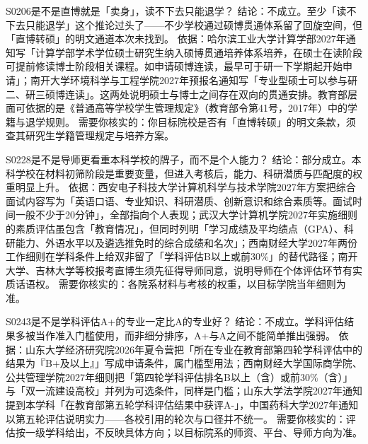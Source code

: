 \begin{qa}{S0206}{是不是直博就是「卖身」，读不下去只能退学？}
结论：不成立。至少「读不下去只能退学」这个推论过头了——不少学校通过硕博贯通体系留了回旋空间，但「直博转硕」的明文通道本次未找到。
依据：哈尔滨工业大学计算学部2027年通知写「计算学部学术学位硕士研究生纳入硕博贯通培养体系培养，在硕士在读阶段可提前修读博士阶段相关课程。如申请硕博连读，最早可于研一下学期起开始申请」；南开大学环境科学与工程学院2027年预报名通知写「专业型硕士可以参与研二、研三硕博连读」。这两处说明硕士与博士之间存在双向的贯通安排。教育部层面可依据的是《普通高等学校学生管理规定》（教育部令第41号，2017年）中的学籍与退学规则。
需要你核实的：你目标院校是否有「直博转硕」的明文条款，须查其研究生学籍管理规定与培养方案。
\end{qa}

\begin{qa}{S0228}{是不是导师更看重本科学校的牌子，而不是个人能力？}
结论：部分成立。本科学校在材料初筛阶段是重要变量，但进入考核后，能力、科研潜质与匹配度的权重明显上升。
依据：西安电子科技大学计算机科学与技术学院2027年方案把综合面试内容写为「英语口语、专业知识、科研潜质、创新意识和综合素质等。面试时间一般不少于20分钟」，全部指向个人表现；武汉大学计算机学院2027年实施细则的素质评估虽包含「教育情况」，但同时列明「学习成绩及平均绩点（GPA）、科研能力、外语水平以及遴选推免时的综合成绩和名次」；西南财经大学2027年两份工作细则在学科条件上给双非留了「学科评估B以上或前30\%」的替代路径；南开大学、吉林大学等校报考直博生须先征得导师同意，说明导师在个体评估环节有实质话语权。
需要你核实的：各院系材料与考核的权重，以目标学院当年细则为准。
\end{qa}

\begin{qa}{S0243}{是不是学科评估A+的专业一定比A的专业好？}
结论：不成立。学科评估结果多被当作准入门槛使用，而非细分排序，A+与A之间不能简单推出强弱。
依据：山东大学经济研究院2026年夏令营把「所在专业在教育部第四轮学科评估中的结果为『B+及以上』」写成申请条件，属门槛型用法；西南财经大学国际商学院、公共管理学院2027年细则把「第四轮学科评估排名B以上（含）或前30\%（含）」与「双一流建设高校」并列为可选条件，同样是门槛；山东大学法学院2027年通知提到本学科「在教育部第五轮学科评估结果中获评A-」，中国药科大学2027年通知以第五轮评估说明实力——各校引用的轮次与口径并不统一。
需要你核实的：评估按一级学科给出，不反映具体方向；以目标院系的师资、平台、导师方向为准。
\end{qa}

